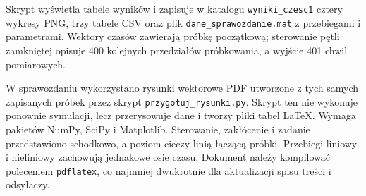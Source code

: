 Skrypt wyświetla tabele wyników i zapisuje w katalogu \texttt{wyniki\_czesc1} cztery wykresy PNG, trzy tabele CSV oraz plik \texttt{dane\_sprawozdanie.mat} z przebiegami i parametrami. Wektory czasów zawierają próbkę początkową; sterowanie pętli zamkniętej opisuje 400 kolejnych przedziałów próbkowania, a wyjście 401 chwil pomiarowych.

W sprawozdaniu wykorzystano rysunki wektorowe PDF utworzone z tych samych zapisanych próbek przez skrypt \texttt{przygotuj\_rysunki.py}. Skrypt ten nie wykonuje ponownie symulacji, lecz przerysowuje dane i tworzy pliki tabel LaTeX. Wymaga pakietów NumPy, SciPy i Matplotlib. Sterowanie, zakłócenie i zadanie przedstawiono schodkowo, a poziom cieczy linią łączącą próbki. Przebiegi liniowy i nieliniowy zachowują jednakowe osie czasu. Dokument należy kompilować poleceniem \texttt{pdflatex}, co najmniej dwukrotnie dla aktualizacji spisu treści i odsyłaczy.
